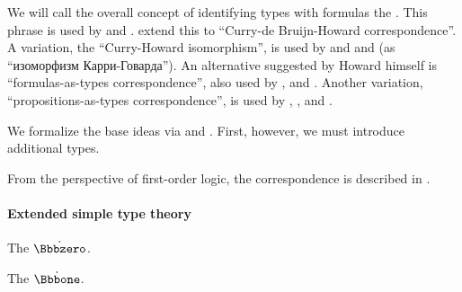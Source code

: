 \begin{concept}
  We will call the overall concept of identifying types with formulas the . This phrase is used by  and .  extend this to \enquote{Curry-de Bruijn-Howard correspondence}. A variation, the \enquote{Curry-Howard isomorphism}, is used by and   and  (as \enquote{изоморфизм Карри-Говарда}). An alternative suggested by Howard himself is \enquote{formulas-as-types correspondence}, also used by ,  and . Another variation, \enquote{propositions-as-types correspondence}, is used by , ,  and .

  We formalize the base ideas via  and . First, however, we must introduce additional types.
\end{concept}
\begin{comments}
  \item From the perspective of first-order logic, the correspondence is described in .
\end{comments}

\paragraph{Extended simple type theory}\hfill

\begin{remark}\label{rem:type_theory_rule_classification}
\end{remark}

\begin{definition}\label{def:empty_type}
  The  \( \syn\Bbbzero \).
\end{definition}

\begin{definition}\label{def:unit_type}
  The  \( \syn\Bbbone \).
\end{definition}

